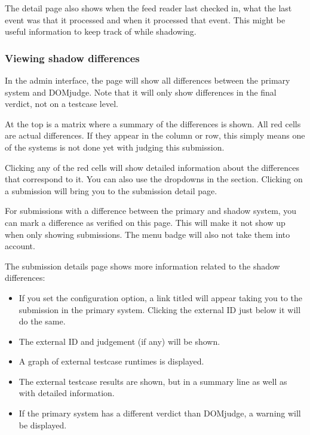 \documentclass[a4paper,10pt,english,openany]{sphinxmanual}
\begin{document}
\sphinxAtStartPar
The detail page also shows when the feed reader last checked in, what the last event
was that it processed and when it processed that event. This might be useful information
to keep track of while shadowing.


\subsubsection{Viewing shadow differences}
\label{\detokenize{shadow:viewing-shadow-differences}}
\sphinxAtStartPar
In the admin interface, the  page will show all differences
between the primary system and DOMjudge. Note that it will only show differences
in the final verdict, not on a testcase level.

\sphinxAtStartPar
At the top is a matrix where a summary of the differences is shown. All red
cells are actual differences. If they appear in the  column or row, this
simply means one of the systems is not done yet with judging this submission.

\sphinxAtStartPar
Clicking any of the red cells will show detailed information about the
differences that correspond to it. You can also use the dropdowns in the
 section. Clicking on a submission will bring you to the submission
detail page.

\sphinxAtStartPar
For submissions with a difference between the primary and shadow system,
you can mark a difference as verified on this page. This will make it not show
up when only showing  submissions. The menu badge will also not take
them into account.

\sphinxAtStartPar
The submission details page shows more information related to the shadow
differences:
\begin{itemize}
\item {} 
\sphinxAtStartPar
If you set the  configuration option, a link
titled  will appear taking you to the submission in the
primary system. Clicking the external ID just below it will do the same.

\item {} 
\sphinxAtStartPar
The external ID and judgement (if any) will be shown.

\item {} 
\sphinxAtStartPar
A graph of external testcase runtimes is displayed.

\item {} 
\sphinxAtStartPar
The external testcase results are shown, but in a summary line as well as
with detailed information.

\item {} 
\sphinxAtStartPar
If the primary system has a different verdict than DOMjudge, a warning will be
displayed.

\end{itemize}
\end{document}
